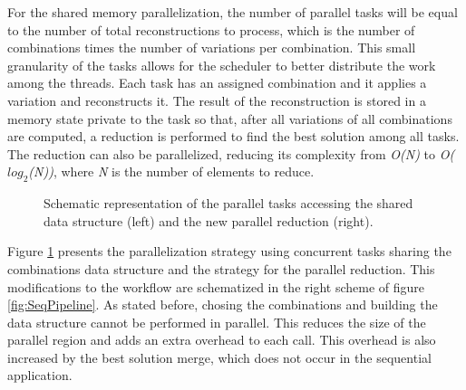 For the shared memory parallelization, the number of parallel tasks will be equal to the number of total reconstructions to process, which is the number of combinations times the number of variations per combination. This small granularity of the tasks allows for the scheduler to better distribute the work among the threads. Each task has an assigned combination and it applies a variation and reconstructs it. The result of the reconstruction is stored in a memory state private to the task so that, after all variations of all combinations are computed, a reduction is performed to find the best solution among all tasks. The reduction can also be parallelized, reducing its complexity from \textit{O(N)} to \textit{O($log_{2}$(N))}, where \textit{N} is the number of elements to reduce.

\begin{figure}[!htp]
	\begin{center}
		\caption{Schematic representation of the parallel tasks accessing the shared data structure (left) and the new parallel reduction (right).}
		\label{fig:ParallelMethodology}
	\end{center}
\end{figure}

Figure \ref{fig:ParallelMethodology} presents the parallelization strategy using concurrent tasks sharing the combinations data structure and the strategy for the parallel reduction. This modifications to the workflow are schematized in the right scheme of figure \ref{fig:SeqPipeline}. As stated before, chosing the combinations and building the data structure cannot be performed in parallel. This reduces the size of the parallel region and adds an extra overhead to each \ttDilepKinFit call. This overhead is also increased by the best solution merge, which does not occur in the sequential application.

